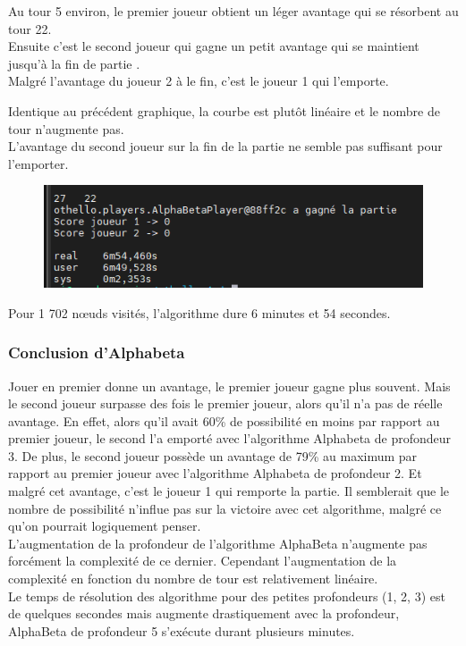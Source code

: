 \documentclass[12pt]{article}
\begin{document}
Au tour 5 environ, le premier joueur obtient un léger avantage qui se résorbent au tour 22.\\
Ensuite c'est le second joueur qui gagne un petit avantage qui se maintient jusqu'à la fin de partie .\\
Malgré l'avantage du joueur 2 à le fin, c'est le joueur 1 qui l'emporte.

Identique au précédent graphique, la courbe est plutôt linéaire et le nombre de tour n'augmente pas.\\

L'avantage du second joueur sur la fin de la partie ne semble pas suffisant pour l'emporter.

\begin{figure}[!h]
   \includegraphics[width=\textwidth]{prof5alphabeta-console.png}
\end{figure}

Pour 1 702 nœuds visités, l’algorithme dure 6 minutes et 54 secondes. 

\subsubsection{Conclusion d’Alphabeta}

Jouer en premier donne un avantage, le premier joueur gagne plus souvent. Mais le second joueur surpasse des fois le premier joueur, alors qu'il n'a pas de réelle avantage. En effet, alors qu'il avait 60\% de possibilité en moins par rapport au premier joueur, le second l'a emporté avec l'algorithme Alphabeta de profondeur 3.
De plus, le second joueur possède un avantage de 79\% au maximum par rapport au premier joueur avec l'algorithme Alphabeta de profondeur 2. Et malgré cet avantage, c'est le joueur 1 qui remporte la partie.
Il semblerait que le nombre de possibilité n'influe pas sur la victoire avec cet algorithme, malgré ce qu'on pourrait logiquement penser.\\

L’augmentation de la profondeur de l’algorithme AlphaBeta n’augmente pas forcément la complexité de ce dernier. Cependant l’augmentation de la complexité en fonction du nombre de tour est relativement linéaire.\\
Le temps de résolution des algorithme pour des petites profondeurs (1, 2, 3) est de quelques secondes mais augmente drastiquement avec la profondeur, AlphaBeta de profondeur 5 s’exécute durant plusieurs minutes. 
\end{document}
